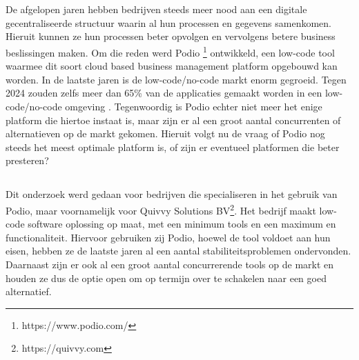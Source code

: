 
\chapter{}%
\label{ch:inleiding} %

De afgelopen jaren hebben bedrijven steeds meer nood aan een digitale gecentraliseerde structuur waarin al hun processen en gegevens samenkomen. Hieruit kunnen ze hun processen beter opvolgen en vervolgens betere business beslissingen maken. Om die reden werd Podio \footnote{https://www.podio.com/} ontwikkeld, een low-code tool waarmee dit soort cloud based business management platform opgebouwd kan worden. In de laatste jaren is de low-code/no-code markt enorm gegroeid. Tegen 2024 zouden zelfs meer dan 65\% van de applicaties gemaakt worden in een low-code/no-code omgeving \autocite{Costello2021}. Tegenwoordig is Podio echter niet meer het enige platform die hiertoe instaat is, maar zijn er al een groot aantal concurrenten of alternatieven op de markt gekomen. Hieruit volgt nu de vraag of Podio nog steeds het meest optimale platform is, of zijn er eventueel platformen die beter presteren? 

\section{}%
\label{sec:probleemstelling} %


Dit onderzoek werd gedaan voor bedrijven die specialiseren in het gebruik van Podio, maar voornamelijk voor Quivvy Solutions BV\footnote{https://quivvy.com}. Het bedrijf maakt low-code software oplossing op maat, met een minimum tools en een maximum en functionaliteit. Hiervoor gebruiken zij Podio, hoewel de tool voldoet aan hun eisen, hebben ze de laatste jaren al een aantal stabiliteitsproblemen ondervonden. Daarnaast zijn er ook al een groot aantal concurrerende tools op de markt en houden ze dus de optie open om op termijn over te schakelen naar een goed alternatief. 

